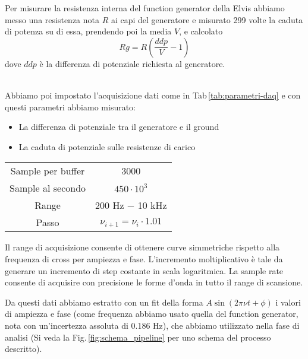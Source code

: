 \documentclass[../Relazione_circuiti]{subfiles}
\begin{document}
  Per misurare la resistenza interna del function generator della Elvis abbiamo messo una resistenza nota $R$ ai capi
  del generatore e misurato 299 volte la caduta di potenza su di essa, prendendo poi la media $V$, e calcolato
  \begin{equation*}
    Rg = R \left( \frac{ddp}{V} - 1 \right)
  \end{equation*}
  dove $ddp$ è la differenza di potenziale richiesta al generatore. \\ \\
  \begin{minipage}{0.49\textwidth}
    \setlength{\parindent}{20pt}
    Abbiamo poi impostato l'acquisizione dati come in Tab\,\ref{tab:parametri-daq} e con questi parametri abbiamo
    misurato:
    \begin{itemize}
      \item La differenza di potenziale tra il generatore e il ground
      \item La caduta di potenziale sulle resistenze di carico
    \end{itemize}

  \end{minipage} \hfill
  \begin{minipage}{0.49\textwidth}

    \centering
    \begin{minipage}{0.85\textwidth}
      \centering
      \begin{tabular}{|c|c|}
        \hline
        Sample per buffer & 3000                           \\
        Sample al secondo & $ 450 \cdot 10^3 $             \\
        Range             & 200 Hz − 10 kHz                \\
        Passo             & $\nu_{i+1} = \nu_i \cdot 1.01$ \\ \hline
      \end{tabular}

      \label{tab:parametri-daq}
    \end{minipage}

  \end{minipage}
  Il range di acquisizione consente di ottenere curve simmetriche rispetto alla frequenza di cross per ampiezza e fase.
  L'incremento moltiplicativo è tale da generare un incremento  di step costante in scala logaritmica.
  La sample rate consente di acquisire con precisione le forme d'onda in tutto il range di scansione.

  Da questi dati abbiamo estratto con un fit della forma $ A \sin\left( 2 \pi \nu t + \phi \right) $ i valori di ampiezza e
  fase (come frequenza abbiamo usato quella del function generator, nota con un'incertezza assoluta di 0.186 Hz), che
  abbiamo utilizzato nella fase di analisi (Si veda la Fig.\,\ref{fig:schema_pipeline} per uno schema del processo
  descritto).
\end{document}
